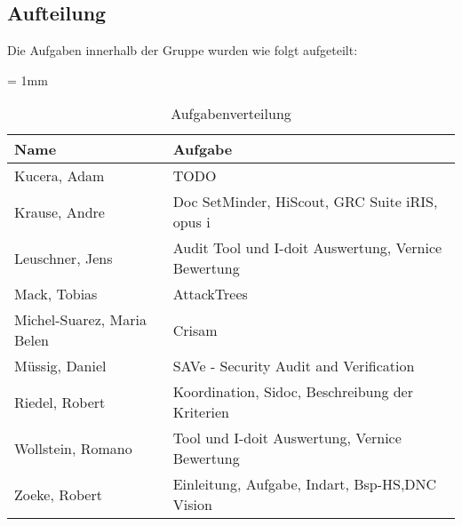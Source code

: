\subsection{Aufteilung}
Die Aufgaben innerhalb der Gruppe wurden wie folgt aufgeteilt:

\begin{table}[H]
	\sffamily
	\caption{Aufgabenverteilung}
	\tabulinesep = 1mm %
	\centering
		\begin{tabu} to 0.9\textwidth { X[1.7]  X[3] }
		\hline
		\textbf{Name} & \textbf{Aufgabe}\\
		\hline 
		Kucera, Adam & TODO\\

		Krause, Andre & Doc SetMinder, HiScout, GRC Suite iRIS, opus i\\

		Leuschner, Jens & Audit Tool und I-doit Auswertung, Vernice Bewertung \\

		Mack, Tobias & AttackTrees\\

		Michel-Suarez, Maria Belen & Crisam\\

		Müssig, Daniel & SAVe - Security Audit and Verification\\

		Riedel, Robert & Koordination, Sidoc, Beschreibung der Kriterien\\

		Wollstein, Romano & Tool und I-doit Auswertung, Vernice Bewertung\\

		Zoeke, Robert & Einleitung, Aufgabe, Indart, Bsp-HS,DNC Vision\\

	\end{tabu}
\end{table}

